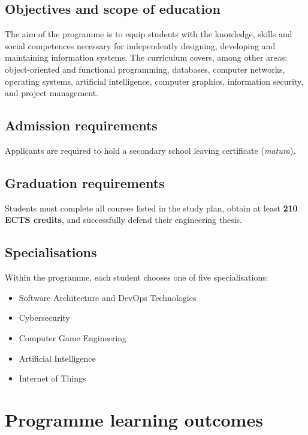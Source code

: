 \documentclass[12pt,a4paper]{article}
\begin{document}
\subsection{Objectives and scope of education}

The aim of the programme is to equip students with the knowledge, skills and social competences necessary for independently designing, developing and maintaining information systems. The curriculum covers, among other areas: object-oriented and functional programming, databases, computer networks, operating systems, artificial intelligence, computer graphics, information security, and project management.

\subsection{Admission requirements}

Applicants are required to hold a secondary school leaving certificate (\textit{matura}).

\subsection{Graduation requirements}

Students must complete all courses listed in the study plan, obtain at least \textbf{210 ECTS credits}, and successfully defend their engineering thesis.

\subsection{Specialisations}

Within the programme, each student chooses one of five specialisations:
\begin{itemize}
  \item Software Architecture and DevOps Technologies
  \item Cybersecurity
  \item Computer Game Engineering
  \item Artificial Intelligence
  \item Internet of Things
\end{itemize}

\newpage

\section{Programme learning outcomes}
\end{document}
